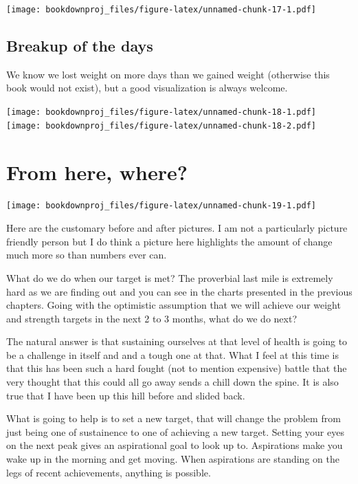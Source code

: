 \documentclass[
  oneside]{book}
\begin{document}
\texttt{[image: bookdownproj\_files/figure-latex/unnamed-chunk-17-1.pdf]}

\hypertarget{breakup-of-the-days}{%
\section{Breakup of the days}\label{breakup-of-the-days}}

We know we lost weight on more days than we gained weight (otherwise this book would not exist), but a good visualization is always welcome.

\texttt{[image: bookdownproj\_files/figure-latex/unnamed-chunk-18-1.pdf]} \texttt{[image: bookdownproj\_files/figure-latex/unnamed-chunk-18-2.pdf]}

\hypertarget{from-here-where}{%
\chapter{From here, where?}\label{from-here-where}}

\texttt{[image: bookdownproj\_files/figure-latex/unnamed-chunk-19-1.pdf]}

Here are the customary before and after pictures. I am not a particularly picture friendly person but I do think a picture here highlights the amount of change much more so than numbers ever can.

What do we do when our target is met? The proverbial last mile is extremely hard as we are finding out and you can see in the charts presented in the previous chapters. Going with the optimistic assumption that we will achieve our weight and strength targets in the next 2 to 3 months, what do we do next?

The natural answer is that sustaining ourselves at that level of health is going to be a challenge in itself and and a tough one at that. What I feel at this time is that this has been such a hard fought (not to mention expensive) battle that the very thought that this could all go away sends a chill down the spine. It is also true that I have been up this hill before and slided back.

What is going to help is to set a new target, that will change the problem from just being one of sustainence to one of achieving a new target. Setting your eyes on the next peak gives an aspirational goal to look up to. Aspirations make you wake up in the morning and get moving. When aspirations are standing on the legs of recent achievements, anything is possible.
\end{document}
